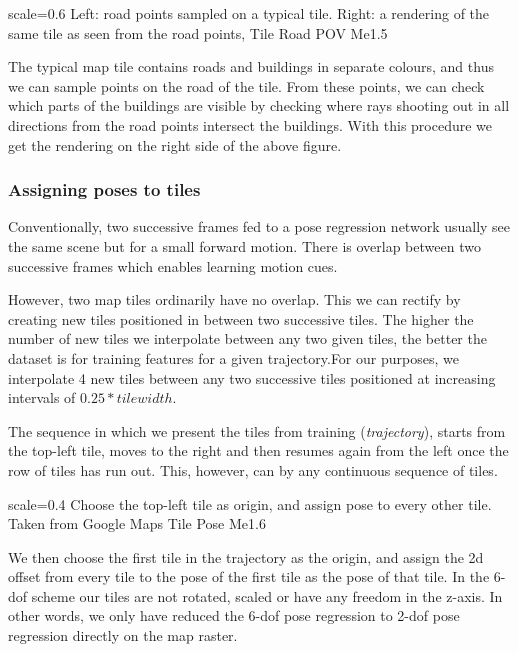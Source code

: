 {scale=0.6}%
{Left: road points sampled on a typical tile. Right: a rendering of the same tile as seen from the road points,  \cite{newman2017}}%
{Tile Road POV}%
{Me1.5}

The typical map tile contains roads and buildings in separate colours, and thus we can sample points on the road of the tile. From these points, we can check which parts of the buildings are visible by checking where rays shooting out in all directions from the road points intersect the buildings. With this procedure we get the rendering on the right side of the above figure. 

\subsubsection{Assigning poses to tiles}
Conventionally, two successive frames fed to a pose regression network usually see the same scene but for a small forward motion. There is overlap between two successive frames which enables learning motion cues. 

However, two map tiles ordinarily have no overlap. This we can rectify by creating new tiles positioned in between two successive tiles. The higher the number of new tiles we interpolate between any two given tiles, the better the dataset is for training features for a given trajectory.For our purposes, we interpolate 4 new tiles between any two successive tiles positioned at increasing intervals of $0.25 * tilewidth$. 

The sequence in which we present the tiles from training (\textit{trajectory}), starts from the top-left tile, moves to the right and then resumes again from the left once the row of tiles has run out. This, however, can by any continuous sequence of tiles.

{scale=0.4}%
{Choose the top-left tile as origin, and assign pose to every other tile. Taken from Google Maps}%
{Tile Pose}%
{Me1.6}

We then choose the first tile in the trajectory as the origin, and assign the 2d offset from every tile to the pose of the first tile as the pose of that tile. In the 6-dof scheme our tiles are not rotated, scaled or have any freedom in the z-axis. In other words, we only have reduced the 6-dof pose regression to 2-dof pose regression directly on the map raster. 

